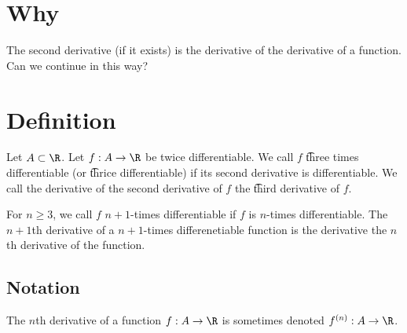 

\section*{Why}

The second derivative (if it exists) is the derivative of the derivative of a function.
Can we continue in this way?

\section*{Definition}

Let $A \subset \R $.
Let $f: A \to \R $ be twice differentiable.
We call $f$ \t{three times differentiable} (or \t{thrice differentiable}) if its second derivative is differentiable.
We call the derivative of the second derivative of $f$ the \t{third derivative} of $f$.

For $n \geq 3$, we call $f$ \t{$n+1$-times differentiable} if $f$ is $n$-times differentiable.
The \t{$n+1$th derivative} of a $n+1$-times differenetiable function is the derivative the $n$th derivative of the function.

\subsection*{Notation}

The $n$th derivative of a function $f: A \to \R $ is sometimes denoted $f^{(n)}: A \to \R $.

\blankpage